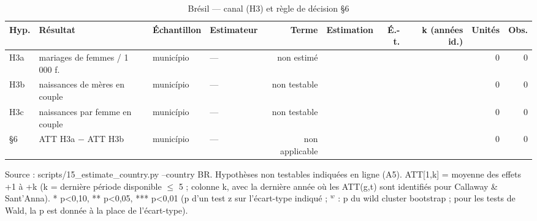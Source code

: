 \begin{table}\centering
\begin{threeparttable}
\caption{Brésil — canal (H3) et règle de décision §6}\label{tab:br_h3}
\scriptsize
\begin{tabular}{llllrrrrrr}
\toprule
Hyp. & Résultat & Échantillon & Estimateur & Terme & Estimation & É.-t. & k (années id.) & Unités & Obs. \\
\midrule
H3a & mariages de femmes / 1 000 f. & município & — & non estimé &  &  &  & 0 & 0 \\
H3b & naissances de mères en couple & município & — & non testable &  &  &  & 0 & 0 \\
H3c & naissances par femme en couple & município & — & non testable &  &  &  & 0 & 0 \\
§6 & ATT H3a $-$ ATT H3b & município & — & non applicable &  &  &  & 0 & 0 \\
\bottomrule
\end{tabular}
\begin{tablenotes}\footnotesize
\item Source : scripts/15\_estimate\_country.py --country BR. Hypothèses non testables indiquées en ligne (A5). ATT[1,k] = moyenne des effets +1 à +k (k = dernière période disponible $\leq$ 5 ; colonne k, avec la dernière année où les ATT(g,t) sont identifiés pour Callaway \& Sant'Anna). * p<0,10, ** p<0,05, *** p<0,01 (p d'un test z sur l'écart-type indiqué ; $^{w}$ : p du wild cluster bootstrap ; pour les tests de Wald, la p est donnée à la place de l'écart-type).
\end{tablenotes}
\end{threeparttable}
\end{table}
